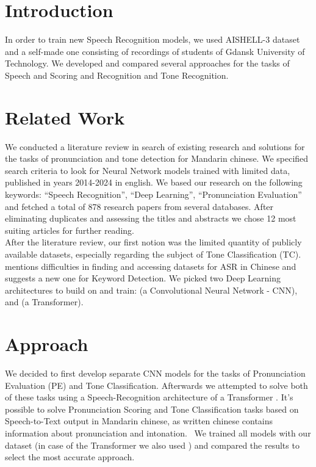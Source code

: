 \documentclass[conference]{IEEEtran}
\begin{document}
\section{Introduction}
In order to train new Speech Recognition models, we used AISHELL-3 \cite{shi2021aishell3multispeakermandarintts} dataset and a self-made one consisting of recordings of students of Gdansk University of Technology. We developed and compared several approaches for the tasks of Speech and Scoring and Recognition and Tone Recognition.

\section{Related Work}
We conducted a literature review in search of existing research and solutions for the tasks of pronunciation and tone detection for Mandarin chinese. We specified search criteria to look for Neural Network models trained with limited data, published in years 2014-2024 in english. We based our research on the following keywords: ``Speech Recognition'', ``Deep Learning'', ``Pronunciation Evaluation'' and fetched a total of 878 research papers from several databases. After eliminating duplicates and assessing the titles and abstracts we chose 12 most suiting articles for further reading. \\
After the literature review, our first notion was the limited quantity of publicly available datasets, especially regarding the subject of Tone Classification (TC). \cite{warden2018speechcommandsdatasetlimitedvocabulary} mentions difficulties in finding and accessing datasets for ASR in Chinese and suggests a new one for Keyword Detection. We picked two Deep Learning architectures to build on and train: \cite{Gao2019ToneNetAC} (a Convolutional Neural Network - CNN), and \cite{8462506} (a Transformer).

\section{Approach}
We decided to first develop separate CNN models for the tasks of Pronunciation Evaluation (PE) and Tone Classification. Afterwards we attempted to solve both of these tasks using a Speech-Recognition architecture of a Transformer \cite{vaswani2023attentionneed,8462506}. It's possible to solve Pronunciation Scoring and Tone Classification tasks based on Speech-to-Text output in Mandarin chinese, as written chinese contains information about pronunciation and intonation. \
We trained all models with our dataset (in case of the Transformer we also used \cite{shi2021aishell3multispeakermandarintts}) and compared the results to select the most accurate approach.
\end{document}
